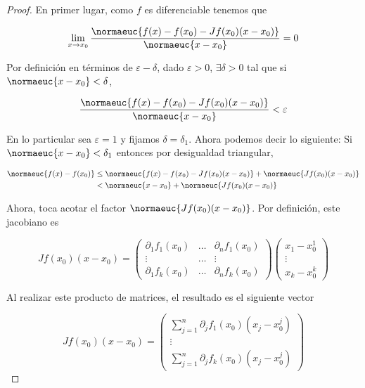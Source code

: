 \begin{proof}
    En primer lugar, como $f$ es diferenciable tenemos que
    
    \[
    \lim_{x \to x_0} \frac{\normaeuc{f(x) - f(x_0) - Jf(x_0)(x - x_0)}}{\normaeuc{x - x_0}} = 0
    \]
    
    Por definición en términos de $\varepsilon - \delta$, dado $\varepsilon > 0$, $\exists \delta > 0$ tal que si $\normaeuc{x-x_0} < \delta$,
    
    \[
    \frac{\normaeuc{f(x) - f(x_0) - Jf(x_0)(x - x_0)}}{\normaeuc{x - x_0}} < \varepsilon
    \]
    
    En lo particular sea $\varepsilon = 1$ y fijamos $\delta = \delta_1$. Ahora podemos decir lo siguiente: Si $\normaeuc{x - x_0} < \delta_1$ entonces por desigualdad triangular,
    
    \begin{align*}
        \normaeuc{f(x) - f(x_0)} &\leq \normaeuc{f(x) - f(x_0) - Jf(x_0)(x-x_0)} + \normaeuc{Jf(x_0)(x-x_0)}\\
            & < \normaeuc{x - x_0} + \normaeuc{Jf(x_0)(x-x_0)}
    \end{align*}
    
    Ahora, toca acotar el factor $\normaeuc{Jf(x_0)(x-x_0)}$. Por definición, este jacobiano es
    
    \[
    Jf(x_0)(x-x_0) =
    \begin{pmatrix}
        \partial_1 f_1 (x_0) & \dots & \partial_n f_1 (x_0) \\
        \vdots             & \dots & \vdots             \\
        \partial_1 f_k (x_0) & \dots & \partial_n f_k (x_0)
    \end{pmatrix}
    \begin{pmatrix}
        x_1-x_0^1 \\
        \vdots    \\
        x_k-x_0^k
    \end{pmatrix}
    \]
    
    Al realizar este producto de matrices, el resultado es el siguiente vector
    
    \[
    Jf(x_0)(x-x_0) =
    \begin{pmatrix}
        \sum_{j=1}^n \partial_j f_1 (x_0) (x_j - x_0^j) \\
        \vdots \\
        \sum_{j=1}^n \partial_j f_k (x_0) (x_j - x_0^j)
    \end{pmatrix}
    \]
    

\end{proof}
